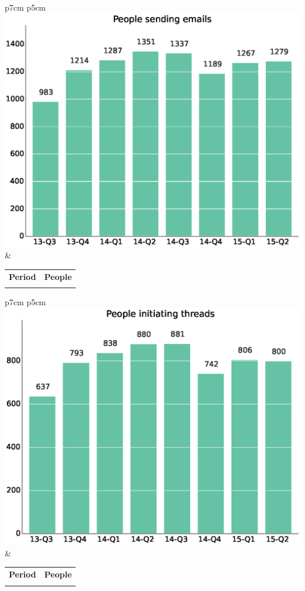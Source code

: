 \documentclass[a4wide,11pt]{report}
\begin{document}
\begin{tabular}{p{7cm} p{5cm}}
    \vspace{0pt} 
    \includegraphics[scale=.35]{figs/emails_senders.eps}
    & 
    \vspace{0pt}
    \begin{tabular}{l|l}%
    \bfseries Period & \bfseries People %
    \csvreader[head to column names]{data/emails_senders.csv}{}%
    {\\ & \senders}
    \end{tabular}
\end{tabular}

\begin{tabular}{p{7cm} p{5cm}}
    \vspace{0pt} 
    \includegraphics[scale=.35]{figs/emails_senders_init.eps}
    & 
    \vspace{0pt}
    \begin{tabular}{l|l}%
    \bfseries Period & \bfseries People %
    \csvreader[head to column names]{data/emails_senders_init.csv}{}%
    {\\ & \senders}
    \end{tabular}
\end{tabular}
\end{document}
